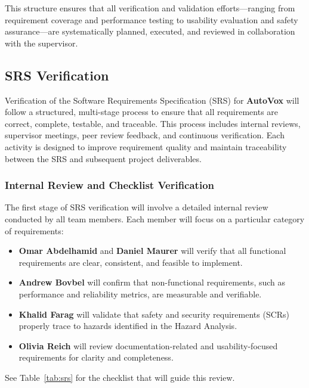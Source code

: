 \documentclass[12pt, titlepage]{article}
\begin{document}
\noindent This structure ensures that all verification and validation efforts—ranging from requirement coverage and performance testing to usability evaluation and safety assurance—are systematically planned, executed, and reviewed in collaboration with the supervisor.\\

\subsection{SRS Verification}

\noindent Verification of the Software Requirements Specification (SRS) for \textbf{AutoVox} will follow a structured, multi-stage process to ensure that all requirements are correct, complete, testable, and traceable. This process includes internal reviews, supervisor meetings, peer review feedback, and continuous verification. Each activity is designed to improve requirement quality and maintain traceability between the SRS and subsequent project deliverables.\\

\subsubsection{Internal Review and Checklist Verification}

\noindent The first stage of SRS verification will involve a detailed internal review conducted by all team members. Each member will focus on a particular category of requirements:\\

\begin{itemize}
  \item \textbf{Omar Abdelhamid} and \textbf{Daniel Maurer} will verify that all functional requirements are clear, consistent, and feasible to implement.
  \item \textbf{Andrew Bovbel} will confirm that non-functional requirements, such as performance and reliability metrics, are measurable and verifiable.
  \item \textbf{Khalid Farag} will validate that safety and security requirements (SCRs) properly trace to hazards identified in the Hazard Analysis.
  \item \textbf{Olivia Reich} will review documentation-related and usability-focused requirements for clarity and completeness.
\end{itemize}

\noindent See Table~\ref{tab:srs} for the checklist that will guide this review.\\
\end{document}
